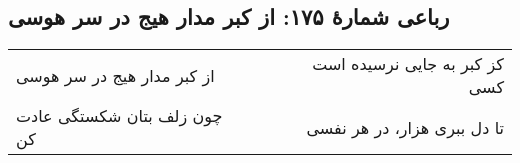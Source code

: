 \begin{center}
\section*{رباعی شمارهٔ ۱۷۵: از کبر مدار هیج در سر هوسی}
\label{sec:175}
\begin{longtable}{l p{0.5cm} r}
از کبر مدار هیج در سر هوسی
&&
کز کبر به جایی نرسیده است کسی
\\
چون زلف بتان شکستگی عادت کن
&&
تا دل ببری  هزار، در هر نفسی
\\
\end{longtable}
\end{center}
